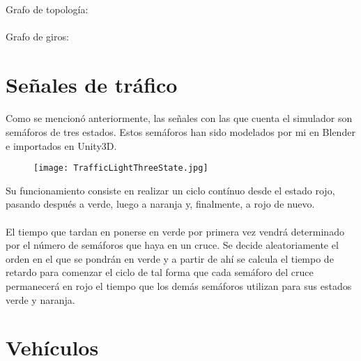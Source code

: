 	\paragraph{}
	Grafo de topología:
	\tiny
	
	\normalsize
	\paragraph{}	
	Grafo de giros:
	\tiny
	
	\normalsize
	
\section{Señales de tráfico}
\label{section:trafficSignals}
	\paragraph{}
	Como se mencionó anteriormente, las señales con las que cuenta el simulador son semáforos de tres estados. Estos semáforos han sido modelados por mi en Blender \cite{Blender_web} e importados en Unity3D.
	
	\begin{figure}[H]
		\centering
			\texttt{[image: TrafficLightThreeState.jpg]}
	\end{figure}
	
	Su funcionamiento consiste en realizar un ciclo contínuo desde el estado rojo, pasando después a verde, luego a naranja y, finalmente, a rojo de nuevo.
	
	\paragraph{}	
	El tiempo que tardan en ponerse en verde por primera vez vendrá determinado por el número de semáforos que haya en un cruce. Se decide aleatoriamente el orden en el que se pondrán en verde y a partir de ahí se calcula el tiempo de retardo para comenzar el ciclo de tal forma que cada semáforo del cruce permanecerá en rojo el tiempo que los demás semáforos utilizan para sus estados verde y naranja.

\section{Vehículos}
	
